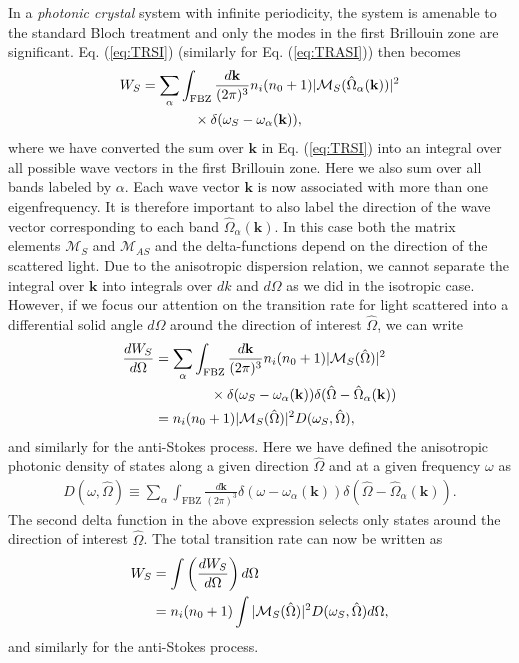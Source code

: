 \documentclass[%
 reprint,
superscriptaddress,
 amsmath,amssymb,
 aps,
pra,
]{revtex4-1}
\newcommand{\mb}[1]{\mathbf{#1}} %
\begin{document}
\vspace{10pt}

In a \textit{photonic crystal} system with infinite periodicity, the system is amenable to the standard Bloch treatment and only the modes in the first Brillouin zone are significant. Eq. (\ref{eq:TRSI}) (similarly for Eq. (\ref{eq:TRASI})) then becomes
\begin{align}\label{eq:TRSPC}
W_{S}= \sum_\alpha &\int_{\text{FBZ}} \frac{d\mb{k}}{(2\pi)^3} n_i (n_0+1)|\mathcal{M}_{S}(\hat{\Omega}_\alpha(\mb{k}))|^2 \notag \\
	&\quad\times\delta(\omega_S-\omega_\alpha(\mb{k})),
\end{align}
%
where we have converted the sum over $\mb{k}$ in Eq. (\ref{eq:TRSI}) into an integral over all possible wave vectors in the first Brillouin zone. Here we also sum over all bands labeled by $\alpha$. Each wave vector $\mb{k}$ is now associated with more than one eigenfrequency. It is therefore important to also label the direction of the wave vector corresponding to each band $\hat{\Omega}_\alpha(\mb{k})$. In this case both the matrix elements $\mathcal{M}_{S}$ and $\mathcal{M}_{AS}$ and the delta-functions depend on the direction of the scattered light. Due to the anisotropic dispersion relation, we cannot separate the integral over $\mb{k}$ into integrals over $dk$ and $d\Omega$ as we did in the isotropic case. However, if we focus our attention on the transition rate for light scattered into a differential solid angle $d\Omega$ around the direction of interest $\hat{\Omega}$, we can write
\begin{align}\label{eq:TRSAI}
\frac{dW_{S}}{d\Omega}&=\sum_\alpha  \int_{\text{FBZ}} \frac{d\mb{k}}{(2\pi)^3} n_i (n_0+1)|\mathcal{M}_{S}(\hat{\Omega})|^2  \notag \\
&\qquad\qquad \times\delta(\omega_S-\omega_\alpha(\mb{k}))\delta(\hat{\Omega}-\hat{\Omega}_\alpha(\mb{k}))\notag \\
&=n_i (n_0+1)|\mathcal{M}_{S}(\hat{\Omega})|^2 D(\omega_S,\hat{\Omega}), 
\end{align}
and similarly for the anti-Stokes process. Here we have defined the anisotropic photonic density of states along a given direction $\hat{\Omega}$ and at a given frequency $\omega$ as
\begin{align}\label{eq:AIDoS}
D(\omega,\hat{\Omega}) \equiv \sum_\alpha \int_{\text{FBZ}} \frac{d\mb{k}}{(2\pi)^3}\delta(\omega-\omega_\alpha(\mb{k})) \delta(\hat{\Omega}-\hat{\Omega}_\alpha(\mb{k})).
\end{align}
The second delta function in the above expression selects only states around the direction of interest $\hat{\Omega}$. The total transition rate can now be written as
\begin{align}
W_S&=\int \left (\frac{dW_{S}}{d\Omega}\right ) d\Omega \notag \\
	&= n_i (n_0+1)\int |\mathcal{M}_{S}(\hat{\Omega})|^2 D(\omega_S,\hat{\Omega}) d\Omega, \notag
\end{align}
and similarly for the anti-Stokes process.
\end{document}
